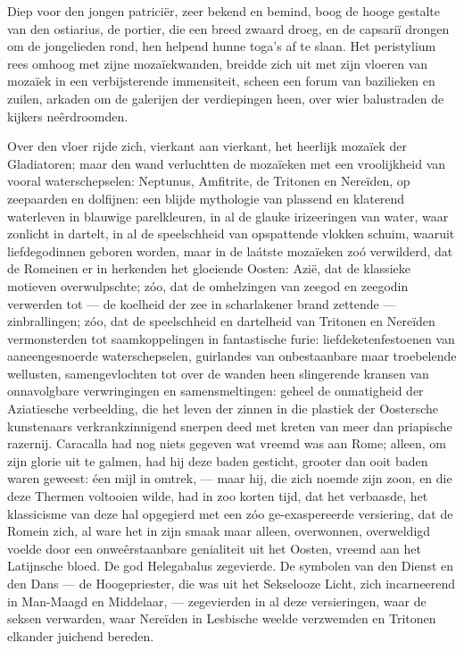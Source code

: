 \documentclass[a4paper, 12pt, oneside, dutch]{article}
\begin{document}
Diep voor den jongen patriciër, zeer bekend en bemind, boog de hooge gestalte van den ostiarius, de portier, die een breed zwaard droeg, en de capsariï drongen om de jongelieden rond, hen helpend hunne toga's af te slaan. Het peristylium rees omhoog met zijne mozaïekwanden, breidde zich uit met zijn vloeren van mozaïek in een verbijsterende immensiteit, scheen een forum van bazilieken en zuilen, arkaden om de galerijen der verdiepingen heen, over wier balustraden de kijkers neêrdroomden.

Over den vloer rijde zich, vierkant aan vierkant, het heerlijk mozaïek der Gladiatoren; maar den wand verluchtten de mozaïeken met een vroolijkheid van vooral waterschepselen: Neptunus, Amfitrite, de Tritonen en Nereïden, op zeepaarden en dolfijnen: een blijde mythologie van plassend en klaterend waterleven in blauwige parelkleuren, in al de glauke irizeeringen van water, waar zonlicht in dartelt, in al de speelschheid van opspattende vlokken schuim, waaruit liefdegodinnen geboren worden, maar in de laátste mozaïeken zoó verwilderd, dat de Romeinen er in herkenden het gloeiende Oosten: Azië, dat de klassieke motieven overwulpschte; zóo, dat de omhelzingen van zeegod en zeegodin verwerden tot --- de koelheid der zee in scharlakener brand zettende --- zinbrallingen; zóo, dat de speelschheid en dartelheid van Tritonen en Nereïden vermonsterden tot saamkoppelingen in fantastische furie: liefdeketenfestoenen van aaneengesnoerde waterschepselen, guirlandes van onbestaanbare maar troebelende wellusten, samengevlochten tot over de wanden heen slingerende kransen van onnavolgbare verwringingen en samensmeltingen: geheel de onmatigheid der Aziatiesche verbeelding, die het leven der zinnen in die plastiek der Oostersche kunstenaars verkrankzinnigend snerpen deed met kreten van meer dan priapische razernij. Caracalla had nog niets gegeven wat vreemd was aan Rome; alleen, om zijn glorie uit te galmen, had hij deze baden gesticht, grooter dan ooit baden waren geweest: éen mijl in omtrek, --- maar hij, die zich noemde zijn zoon, en die deze Thermen voltooien wilde, had in zoo korten tijd, dat het verbaasde, het klassicisme van deze hal opgegierd met een zóo ge-exaspereerde versiering, dat de Romein zich, al ware het in zijn smaak maar alleen, overwonnen, overweldigd voelde door een onweêrstaanbare genialiteit uit het Oosten, vreemd aan het Latijnsche bloed. De god Helegabalus zegevierde. De symbolen van den Dienst en den Dans --- de Hoogepriester, die was uit het Sekselooze Licht, zich incarneerend in Man-Maagd en Middelaar, --- zegevierden in al deze versieringen, waar de seksen verwarden, waar Nereïden in Lesbische weelde verzwemden en Tritonen elkander juichend bereden.
\end{document}
